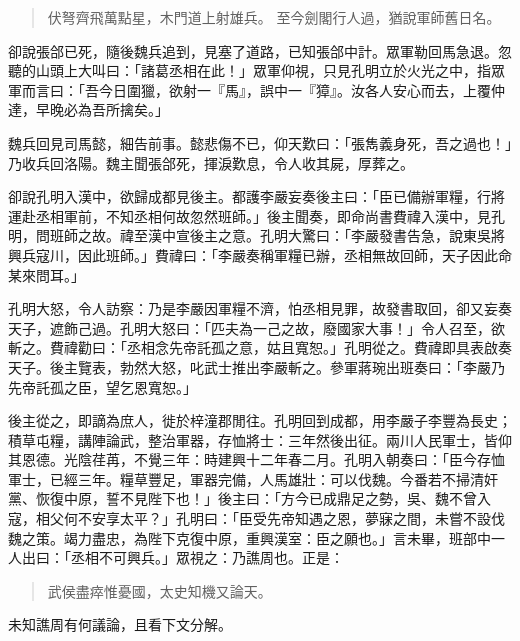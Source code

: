 \begin{quote}
伏弩齊飛萬點星，木門道上射雄兵。
至今劍閣行人過，猶說軍師舊日名。
\end{quote}

卻說張郃已死，隨後魏兵追到，見塞了道路，已知張郃中計。眾軍勒回馬急退。忽聽的山頭上大叫曰：「諸葛丞相在此！」眾軍仰視，只見孔明立於火光之中，指眾軍而言曰：「吾今日圍獵，欲射一『馬』，誤中一『獐』。汝各人安心而去，上覆仲達，早晚必為吾所擒矣。」

魏兵回見司馬懿，細告前事。懿悲傷不已，仰天歎曰：「張雋義身死，吾之過也！」乃收兵回洛陽。魏主聞張郃死，揮淚歎息，令人收其屍，厚葬之。

卻說孔明入漢中，欲歸成都見後主。都護李嚴妄奏後主曰：「臣已備辦軍糧，行將運赴丞相軍前，不知丞相何故忽然班師。」後主聞奏，即命尚書費禕入漢中，見孔明，問班師之故。禕至漢中宣後主之意。孔明大驚曰：「李嚴發書告急，說東吳將興兵寇川，因此班師。」費禕曰：「李嚴奏稱軍糧已辦，丞相無故回師，天子因此命某來問耳。」

孔明大怒，令人訪察：乃是李嚴因軍糧不濟，怕丞相見罪，故發書取回，卻又妄奏天子，遮飾己過。孔明大怒曰：「匹夫為一己之故，廢國家大事！」令人召至，欲斬之。費禕勸曰：「丞相念先帝託孤之意，姑且寬恕。」孔明從之。費禕即具表啟奏天子。後主覽表，勃然大怒，叱武士推出李嚴斬之。參軍蔣琬出班奏曰：「李嚴乃先帝託孤之臣，望乞恩寬恕。」

後主從之，即謫為庶人，徙於梓潼郡閒往。孔明回到成都，用李嚴子李豐為長史；積草屯糧，講陣論武，整治軍器，存恤將士：三年然後出征。兩川人民軍士，皆仰其恩德。光陰荏苒，不覺三年：時建興十二年春二月。孔明入朝奏曰：「臣今存恤軍士，已經三年。糧草豐足，軍器完備，人馬雄壯：可以伐魏。今番若不掃清奸黨、恢復中原，誓不見陛下也！」後主曰：「方今已成鼎足之勢，吳、魏不曾入寇，相父何不安享太平？」孔明曰：「臣受先帝知遇之恩，夢寐之間，未嘗不設伐魏之策。竭力盡忠，為陛下克復中原，重興漢室：臣之願也。」言未畢，班部中一人出曰：「丞相不可興兵。」眾視之：乃譙周也。正是：

\begin{quote}
武侯盡瘁惟憂國，太史知機又論天。
\end{quote}

未知譙周有何議論，且看下文分解。
